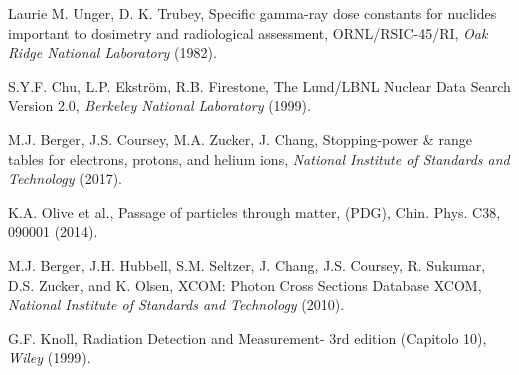 \begin{thebibliography}{99} %

Laurie M. Unger, D. K. Trubey, Specific gamma-ray dose constants for nuclides important to dosimetry and radiological assessment, ORNL/RSIC-45/RI, \emph{Oak Ridge National Laboratory} (1982).

S.Y.F. Chu, L.P. Ekström, R.B. Firestone, The Lund/LBNL Nuclear Data Search Version 2.0, \emph{Berkeley National Laboratory} (1999).

M.J. Berger, J.S. Coursey, M.A. Zucker, J. Chang, Stopping-power \& range tables for electrons, protons, and helium ions, \emph{National Institute of Standards and Technology} (2017).

K.A. Olive et al., Passage of particles through matter, (PDG), Chin. Phys. C38, 090001 (2014).

M.J. Berger, J.H. Hubbell, S.M. Seltzer, J. Chang, J.S. Coursey, R. Sukumar, D.S. Zucker, and K. Olsen, XCOM: Photon Cross Sections Database XCOM, \emph{National Institute of Standards and Technology} (2010).

G.F. Knoll, Radiation Detection and Measurement- 3rd edition (Capitolo 10), \emph{Wiley} (1999).

\end{thebibliography}
